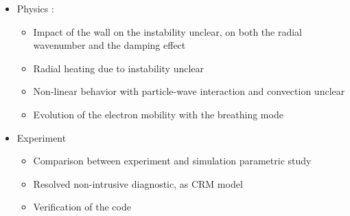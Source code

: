 \begin{itemize}
  \item Physics :
  \begin{itemize}
    \item Impact of the wall on the instability unclear, on both the radial wavenumber and the damping effect
    \item Radial heating due to instability unclear
    \item Non-linear behavior with particle-wave interaction and convection unclear
    \item Evolution of the electron mobility with the breathing mode
  \end{itemize}


  \item Experiment
  \begin{itemize}
    \item Comparison between experiment and simulation parametric study
    \item Resolved non-intrusive diagnostic, as CRM model
    \item Verification of the code
  \end{itemize}
  
  
\end{itemize}



